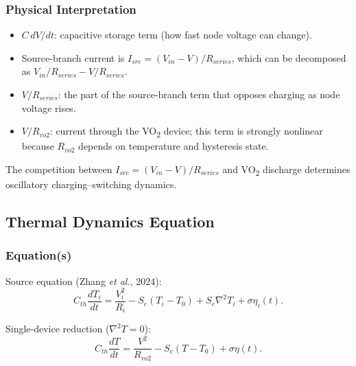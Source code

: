 \documentclass[11pt]{article}
\begin{document}
\subsubsection*{Physical Interpretation}
\begin{itemize}
    \item \(C\,dV/dt\): capacitive storage term (how fast node voltage can change).
    \item Source-branch current is \(I_{src}=(V_{in}-V)/R_{series}\), which can be decomposed as \(V_{in}/R_{series}-V/R_{series}\).
    \item \(V/R_{series}\): the part of the source-branch term that opposes charging as node voltage rises.
    \item \(V/R_{vo2}\): current through the VO\textsubscript{2} device; this term is strongly nonlinear because \(R_{vo2}\) depends on temperature and hysteresis state.
\end{itemize}
The competition between \(I_{src}=(V_{in}-V)/R_{series}\) and VO\textsubscript{2} discharge determines oscillatory charging--switching dynamics.

\subsection{Thermal Dynamics Equation}
\subsubsection*{Equation(s)}
Source equation (Zhang \emph{et al.}, 2024):
\begin{equation}
C_{th}\frac{dT_i}{dt}=\frac{V_i^2}{R_i}-S_e(T_i-T_0)+S_c\nabla^2T_i+\sigma\eta_i(t).
\label{eq:intro_thermal_original}
\end{equation}

Single-device reduction (\(\nabla^2T=0\)):
\begin{equation}
C_{th}\frac{dT}{dt}=\frac{V^2}{R_{vo2}}-S_e(T-T_0)+\sigma\eta(t).
\label{eq:intro_thermal_single}
\end{equation}
\end{document}
